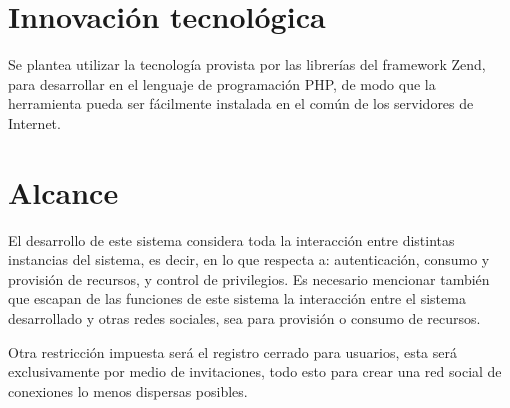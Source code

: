 \section{Innovación tecnológica}
Se plantea utilizar la tecnología provista por las librerías del framework
Zend, para desarrollar en el lenguaje de programación PHP, de modo que la
herramienta pueda ser fácilmente instalada en el común de los servidores de
Internet.

\section{Alcance}
El desarrollo de este sistema considera toda la interacción entre distintas
instancias del sistema, es decir, en lo que respecta a: autenticación,
consumo y provisión de recursos, y control de privilegios. Es necesario
mencionar también que escapan de las funciones de este sistema la interacción
entre el sistema desarrollado y otras redes sociales, sea para provisión o
consumo de recursos.

Otra restricción impuesta será el registro cerrado para usuarios, esta será
exclusivamente por medio de invitaciones, todo esto para crear una red social
de conexiones lo menos dispersas posibles.

